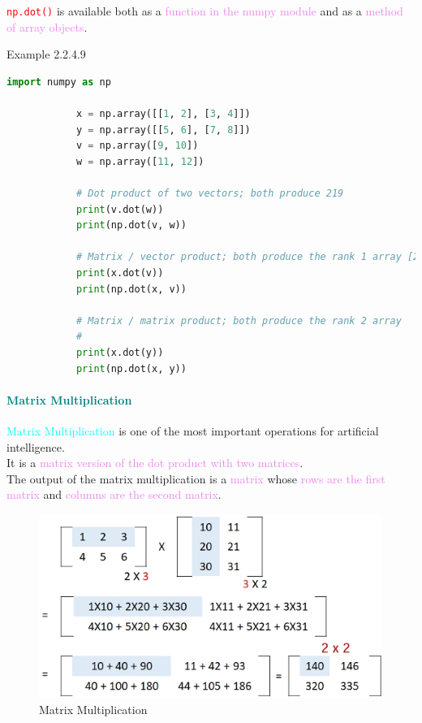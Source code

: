 \documentclass{book}
\begin{document}
\textcolor{red}{\texttt{np.dot()}} is available both as a \textcolor{violet}{function in the numpy module} and as a \textcolor{violet}{method of array objects}.
\newpage
\begin{egBox}{Example 2.2.4.9}{}
    \begin{lstlisting}[language=Python, basicstyle=\ttfamily\small, keywordstyle=\color{blue}, commentstyle=\color{forestgreen}, stringstyle=\color{red}, showstringspaces=false]
            import numpy as np

            x = np.array([[1, 2], [3, 4]])
            y = np.array([[5, 6], [7, 8]])
            v = np.array([9, 10])
            w = np.array([11, 12])

            # Dot product of two vectors; both produce 219
            print(v.dot(w))
            print(np.dot(v, w))

            # Matrix / vector product; both produce the rank 1 array [29 67]
            print(x.dot(v))
            print(np.dot(x, v))

            # Matrix / matrix product; both produce the rank 2 array    [[19 22]
            #                                                            [43 50]]
            print(x.dot(y))
            print(np.dot(x, y))     
    \end{lstlisting}
\end{egBox}
\textcolor{teal}{\paragraph{Matrix Multiplication}}
\textcolor{cyan}{Matrix Multiplication} is one of the most important operations for artificial intelligence.\\
It is a \textcolor{violet}{matrix version of the dot product with two matrices}.\\
The output of the matrix multiplication is a \textcolor{violet}{matrix} whose \textcolor{violet}{rows are the first matrix} and \textcolor{violet}{columns are the second matrix}.\\
\begin{figure}[h]
    \centering
    \includegraphics[scale=0.8]{chapter 2/ch2_figure4.jpeg}
    \caption{Matrix Multiplication}
\end{figure}
\end{document}
